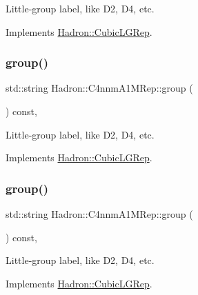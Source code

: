 Little-\/group label, like D2, D4, etc. 

Implements \mbox{\hyperlink{structHadron_1_1CubicLGRep_a9bdb14b519a611d21379ed96a3a9eb41}{Hadron\+::\+Cubic\+L\+G\+Rep}}.

\mbox{\label{structHadron_1_1C4nnmA1MRep_a06930a4ede24739b06df899ea0e6893d}} 
\subsubsection{\texorpdfstring{group()}{group()}\hspace{0.1cm}{\footnotesize\ttfamily [2/3]}}
{\footnotesize\ttfamily std\+::string Hadron\+::\+C4nnm\+A1\+M\+Rep\+::group (\begin{DoxyParamCaption}{ }\end{DoxyParamCaption}) const\hspace{0.3cm}{\ttfamily [inline]}, {\ttfamily [virtual]}}

Little-\/group label, like D2, D4, etc. 

Implements \mbox{\hyperlink{structHadron_1_1CubicLGRep_a9bdb14b519a611d21379ed96a3a9eb41}{Hadron\+::\+Cubic\+L\+G\+Rep}}.

\mbox{\label{structHadron_1_1C4nnmA1MRep_a06930a4ede24739b06df899ea0e6893d}} 
\subsubsection{\texorpdfstring{group()}{group()}\hspace{0.1cm}{\footnotesize\ttfamily [3/3]}}
{\footnotesize\ttfamily std\+::string Hadron\+::\+C4nnm\+A1\+M\+Rep\+::group (\begin{DoxyParamCaption}{ }\end{DoxyParamCaption}) const\hspace{0.3cm}{\ttfamily [inline]}, {\ttfamily [virtual]}}

Little-\/group label, like D2, D4, etc. 

Implements \mbox{\hyperlink{structHadron_1_1CubicLGRep_a9bdb14b519a611d21379ed96a3a9eb41}{Hadron\+::\+Cubic\+L\+G\+Rep}}.

\mbox{\label{structHadron_1_1C4nnmA1MRep_af64812449271d9ce89fbba35fc41f7b7}} 
